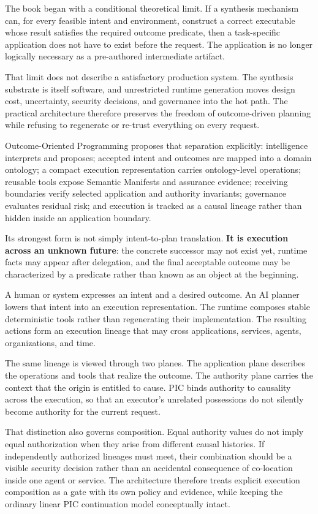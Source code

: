 \documentclass[10pt,oneside,openany]{book}
\begin{document}
The book began with a conditional theoretical limit. If a synthesis mechanism can, for every feasible intent and environment, construct a correct executable whose result satisfies the required outcome predicate, then a task-specific application does not have to exist before the request. The application is no longer logically necessary as a pre-authored intermediate artifact.

That limit does not describe a satisfactory production system. The synthesis substrate is itself software, and unrestricted runtime generation moves design cost, uncertainty, security decisions, and governance into the hot path. The practical architecture therefore preserves the freedom of outcome-driven planning while refusing to regenerate or re-trust everything on every request.

Outcome-Oriented Programming proposes that separation explicitly: intelligence interprets and proposes; accepted intent and outcomes are mapped into a domain ontology; a compact execution representation carries ontology-level operations; reusable tools expose Semantic Manifests and assurance evidence; receiving boundaries verify selected application and authority invariants; governance evaluates residual risk; and execution is tracked as a causal lineage rather than hidden inside an application boundary.

Its strongest form is not simply intent-to-plan translation. \textbf{It is execution across an unknown future}: the concrete successor may not exist yet, runtime facts may appear after delegation, and the final acceptable outcome may be characterized by a predicate rather than known as an object at the beginning.

A human or system expresses an intent and a desired outcome. An AI planner lowers that intent into an execution representation. The runtime composes stable deterministic tools rather than regenerating their implementation. The resulting actions form an execution lineage that may cross applications, services, agents, organizations, and time.

The same lineage is viewed through two planes. The application plane describes the operations and tools that realize the outcome. The authority plane carries the context that the origin is entitled to cause. PIC binds authority to causality across the execution, so that an executor's unrelated possessions do not silently become authority for the current request.


That distinction also governs composition. Equal authority values do not imply equal authorization when they arise from different causal histories. If independently authorized lineages must meet, their combination should be a visible security decision rather than an accidental consequence of co-location inside one agent or service. The architecture therefore treats explicit execution composition as a gate with its own policy and evidence, while keeping the ordinary linear PIC continuation model conceptually intact.
\end{document}
